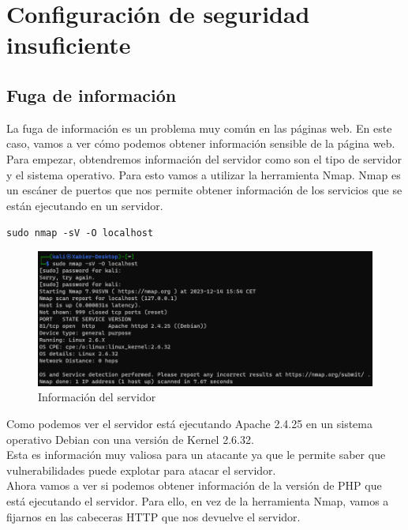 \documentclass{report}
\begin{document}
        \section{Configuración de seguridad insuficiente}
            \subsection{Fuga de información}
                La fuga de información es un problema muy común en las páginas web.
                En este caso, vamos a ver cómo podemos obtener información sensible de la página web.\\

                Para empezar, obtendremos información del servidor como son el tipo de servidor y el sistema operativo.
                Para esto vamos a utilizar la herramienta Nmap.
                Nmap es un escáner de puertos que nos permite obtener información de los servicios que se están ejecutando en un servidor.
                \begin{center}
                    \texttt{sudo nmap -sV -O localhost}
                \end{center}
                \begin{figure}[H]
                    \centering
                    \includegraphics[width=1\textwidth]{./img/vulnerabilidades/2.4/1.1.png}
                    \caption{Información del servidor}
                \end{figure}
                Como podemos ver el servidor está ejecutando Apache 2.4.25 en un sistema operativo Debian con una versión de Kernel 2.6.32.\\
                Esta es información muy valiosa para un atacante ya que le permite saber que vulnerabilidades puede explotar para atacar el servidor.\\
                \clearpage
                Ahora vamos a ver si podemos obtener información de la versión de PHP que está ejecutando el servidor.
                Para ello, en vez de la herramienta Nmap, vamos a fijarnos en las cabeceras HTTP que nos devuelve el servidor.
\end{document}
